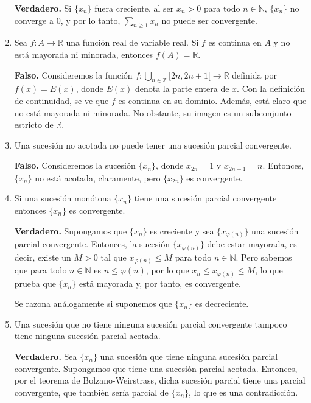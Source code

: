 \documentclass[10pt,a4paper]{article}
\begin{document}
\begin{enumerate}
		\textbf{Verdadero. }Si $\{x_n\}$ fuera creciente, al ser $x_n > 0$ para todo $n \in \mathbb{N}$, $\{x_n\}$ no converge a $0$, y por lo tanto, $\displaystyle \sum_{n \geq 1} x_n$ no puede ser convergente. \newline
		
		\item Sea $f: A \rightarrow \mathbb{R}$ una función real de variable real. Si $f$ es continua en $A$ y no está mayorada ni minorada, entonces $f(A) = \mathbb{R}$.
		
		\textbf{Falso. }Consideremos la función $f : \displaystyle \bigcup_{n \in \mathbb{Z}} [2n, 2n+1[ \rightarrow \mathbb{R}$ definida por $f(x) = E(x)$, donde $E(x)$ denota la parte entera de $x$. Con la definición de continuidad, se ve que $f$ es continua en su dominio. Además, está claro que no está mayorada ni minorada. No obstante, su imagen es un subconjunto estricto de $\mathbb{R}$. \newline
		
		\item Una sucesión no acotada no puede tener una sucesión parcial convergente.
		
		\textbf{Falso. }Consideremos la sucesión $\{x_n\}$, donde $x_{2n} = 1$ y $x_{2n+1} = n$. Entonces, $\{x_n\}$ no está acotada, claramente, pero $\{x_{2n}\}$ es convergente. \newline
		
		\item Si una sucesión monótona $\{x_n\}$ tiene una sucesión parcial convergente entonces $\{x_n\}$ es convergente.
				
		\textbf{Verdadero. }Supongamos que $\{x_n\}$ es creciente y sea $\{x_{\varphi(n)}\}$ una sucesión parcial convergente. Entonces, la sucesión $\{x_{\varphi(n)}\}$ debe estar mayorada, es decir, existe un $M > 0$ tal que $x_{\varphi(n)} \leq M$ para todo $n \in \mathbb{N}$. Pero sabemos que para todo $n \in \mathbb{N}$ es $n \leq \varphi(n)$, por lo que $x_n \leq x_{\varphi(n)} \leq M$, lo que prueba que $\{x_n\}$ está mayorada y, por tanto, es convergente.
		
		Se razona análogamente si suponemos que $\{x_n\}$ es decreciente. \newline
		
		\item Una sucesión que no tiene ninguna sucesión parcial convergente tampoco tiene ninguna sucesión parcial acotada.
		
		\textbf{Verdadero. }Sea $\{x_n\}$ una sucesión que tiene ninguna sucesión parcial convergente. Supongamos que tiene una sucesión parcial acotada. Entonces, por el teorema de Bolzano-Weirstrass, dicha sucesión parcial tiene una parcial convergente, que también sería parcial de $\{x_n\}$, lo que es una contradicción. \newline
		

\end{enumerate}
\end{document}
